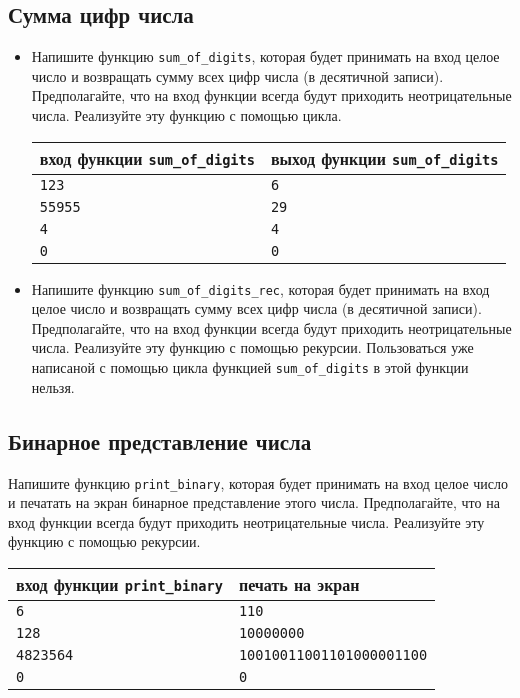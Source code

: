 \documentclass{article}
\begin{document}
\subsection{Сумма цифр числа}
\begin{itemize}
\item Напишите функцию \texttt{sum\_of\_digits}, которая будет принимать на вход целое число и возвращать сумму всех цифр числа (в десятичной записи). Предполагайте, что на вход функции всегда будут приходить неотрицательные числа. Реализуйте эту функцию с помощью цикла.

\begin{center}
\begin{tabular}{ l | l }
 вход функции \texttt{sum\_of\_digits} & выход функции \texttt{sum\_of\_digits} \\ \hline
 \texttt{123} & \texttt{6}  \\
 \texttt{55955} & \texttt{29}  \\  
 \texttt{4} & \texttt{4}  \\
 \texttt{0} & \texttt{0}  \\
\end{tabular}
\end{center}

\item Напишите функцию \texttt{sum\_of\_digits\_rec}, которая будет принимать на вход целое число и возвращать сумму всех цифр числа (в десятичной записи). Предполагайте, что на вход функции всегда будут приходить неотрицательные числа. Реализуйте эту функцию с помощью рекурсии. Пользоваться уже написаной с помощью цикла функцией \texttt{sum\_of\_digits} в этой функции нельзя.
 \end{itemize}
 
 
\subsection{Бинарное представление числа}
Напишите функцию \texttt{print\_binary}, которая будет принимать на вход целое число и печатать на экран бинарное представление этого числа. Предполагайте, что на вход функции всегда будут приходить неотрицательные числа.
Реализуйте эту функцию с помощью рекурсии.
 
\begin{center}
\begin{tabular}{ l | l }
 вход функции \texttt{print\_binary} & печать на экран \\ \hline
 \texttt{6} & \texttt{110}  \\
 \texttt{128} & \texttt{10000000}  \\  
 \texttt{4823564} & \texttt{10010011001101000001100}  \\
 \texttt{0} & \texttt{0}  \\
\end{tabular}
\end{center} 
 
\end{document}
